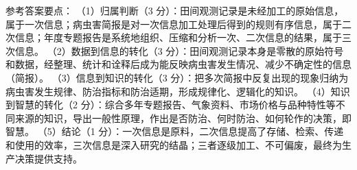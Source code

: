 \documentclass[a4paper,11pt]{article}
\begin{document}

\q 参考答案要点：
（1）归属判断（3 分）：田间观测记录是未经加工的原始信息，属于一次信息；病虫害简报是对一次信息加工处理后得到的规则有序信息，属于二次信息；年度专题报告是系统地组织、压缩和分析一次、二次信息的结果，属于三次信息。
（2）数据到信息的转化（3 分）：田间观测记录本身是零散的原始符号和数据，经整理、统计和诠释后成为能反映病虫害发生情况、减少不确定性的信息（简报）。
（3）信息到知识的转化（3 分）：把多次简报中反复出现的现象归纳为病虫害发生规律、防治指标和防治适期，形成规律化、逻辑化的知识。
（4）知识到智慧的转化（2 分）：综合多年专题报告、气象资料、市场价格与品种特性等不同来源的知识，导出一般性原理，作出是否防治、何时防治、如何轮作的决策，即智慧。
（5）结论（1 分）：一次信息是原料，二次信息提高了存储、检索、传递和使用的效率，三次信息是深入研究的结晶；三者逐级加工、不可偏废，最终为生产决策提供支持。
\end{document}

